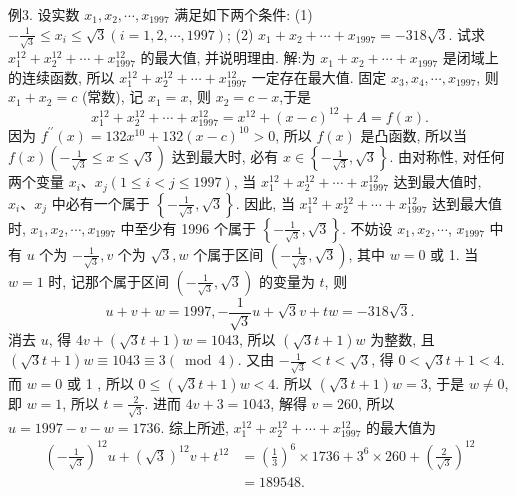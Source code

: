 例3. 设实数 $x_1, x_2, \cdots, x_{1997}$ 满足如下两个条件:
(1) $-\frac{1}{\sqrt{3}} \leqslant x_i \leqslant \sqrt{3}(i=1,2, \cdots, 1997)$;
(2) $x_1+x_2+\cdots+x_{1997}=-318 \sqrt{3}$.
试求 $x_1^{12}+x_2^{12}+\cdots+x_{1997}^{12}$ 的最大值, 并说明理由.
解:为 $x_1+x_2+\cdots+x_{1997}$ 是闭域上的连续函数, 所以 $x_1^{12}+x_2^{12}+\cdots+ x_{1997}^{12}$ 一定存在最大值.
固定 $x_3, x_4, \cdots, x_{1997}$, 则 $x_1+x_2=c$ (常数), 记 $x_1= x$, 则 $x_2=c-x$,于是
$$
x_1^{12}+x_2^{12}+\cdots+x_{1997}^{12}=x^{12}+(x-c)^{12}+A=f(x) .
$$
因为 $f^{\prime \prime}(x)=132 x^{10}+132(x-c)^{10}>0$, 所以 $f(x)$ 是凸函数, 所以当 $f(x)\left(-\frac{1}{\sqrt{3}} \leqslant x \leqslant \sqrt{3}\right)$ 达到最大时, 必有 $x \in\left\{-\frac{1}{\sqrt{3}}, \sqrt{3}\right\}$. 由对称性, 对任何两个变量 $x_i 、 x_j(1 \leqslant i<j \leqslant 1997)$, 当 $x_1^{12}+x_2^{12}+\cdots+x_{1997}^{12}$ 达到最大值时, $x_i 、 x_j$ 中必有一个属于 $\left\{-\frac{1}{\sqrt{3}}, \sqrt{3}\right\}$. 因此, 当 $x_1^{12}+x_2^{12}+\cdots+x_{1997}^{12}$ 达到最大值时, $x_1, x_2, \cdots, x_{1997}$ 中至少有 1996 个属于 $\left\{-\frac{1}{\sqrt{3}}, \sqrt{3}\right\}$. 不妨设 $x_1, x_2, \cdots$, $x_{1997}$ 中有 $u$ 个为 $-\frac{1}{\sqrt{3}}, v$ 个为 $\sqrt{3}, w$ 个属于区间 $\left(-\frac{1}{\sqrt{3}}, \sqrt{3}\right)$, 其中 $w=0$ 或 1. 当 $w=1$ 时, 记那个属于区间 $\left(-\frac{1}{\sqrt{3}}, \sqrt{3}\right)$ 的变量为 $t$, 则
$$
u+v+w=1997,-\frac{1}{\sqrt{3}} u+\sqrt{3} v+t w=-318 \sqrt{3} .
$$
消去 $u$, 得 $4 v+(\sqrt{3} t+1) w=1043$, 所以 $(\sqrt{3} t+1) w$ 为整数, 且 $(\sqrt{3} t+1) w \equiv 1043 \equiv 3(\bmod 4)$. 又由 $-\frac{1}{\sqrt{3}}<t<\sqrt{3}$, 得 $0<\sqrt{3} t+1<4$. 而 $w=0$ 或 1 , 所以 $0 \leqslant(\sqrt{3} t+1) w<4$. 所以 $(\sqrt{3} t+1) w=3$, 于是 $w \neq 0$, 即 $w=1$, 所以 $t=\frac{2}{\sqrt{3}}$. 进而 $4 v+3=1043$, 解得 $v=260$, 所以 $u=1997-v-w=1736$.
综上所述, $x_1^{12}+x_2^{12}+\cdots+x_{1997}^{12}$ 的最大值为
$$
\begin{aligned}
\left(-\frac{1}{\sqrt{3}}\right)^{12} u+(\sqrt{3})^{12} v+t^{12} & =\left(\frac{1}{3}\right)^6 \times 1736+3^6 \times 260+\left(\frac{2}{\sqrt{3}}\right)^{12} \\
& =189548 .
\end{aligned}
$$




